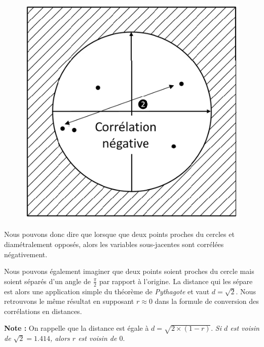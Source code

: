 \begin{figure}[H]\begin{center}\includegraphics[scale=0.5]{ilu/hyperProjdn.png}\end{center}\end{figure}

Nous pouvons donc dire que lorsque que deux points proches du cercles et diamétralement opposés, alors les variables sous-jacentes sont corrélées négativement.\newline

Nous pouvons également imaginer que deux points soient proches du cercle mais soient séparés d'un angle de $\frac{\pi}{2}$ par rapport à l'origine. La distance qui les sépare est alors une application simple du théorème de \textit{Pythagote} et vaut $d = \sqrt{2}$. Nous retrouvons le même résultat en supposant $r\approx 0$ dans la formule de conversion des corrélations en distances.\newline

\textbf{Note : } On rappelle que la distance est égale à $d = \sqrt{2\times(1-r)}$. \textit{Si $d$ est voisin de $\sqrt{2} = 1.414$, alors $r$ est voisin de $0$}.

